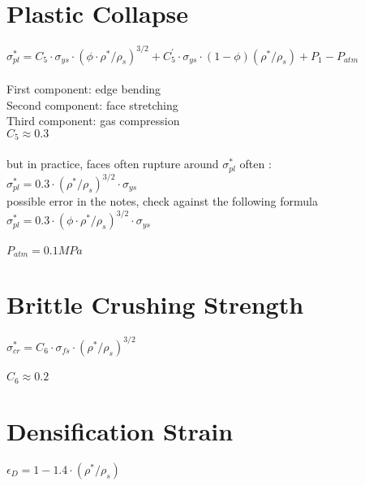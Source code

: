 \documentclass[12pt]{article}
\begin{document}
\section{Plastic Collapse}

\Large
$\sigma^*_{pl} = C_5 \cdot \sigma_{ys} \cdot (\phi \cdot \rho^* / \rho_s)^{3/2} +
C_5^{'} \cdot \sigma_{ys} \cdot (1-\phi) (\rho^* / \rho_s) +
P_1-P_{atm}$\\
\\
\normalsize
First component: edge bending\\
Second component: face stretching\\
Third component: gas compression\\
$C_5 \approx 0.3$\\
\\
but in practice, faces often rupture around $\sigma^*_{pl}$
often :\\
\Large
$\sigma^*_{pl} = 0.3 \cdot (\rho^* / \rho_s)^{3/2} \cdot \sigma_{ys}$\\
\normalsize
possible error in the notes, check against the following formula\\
\Large
$\sigma^*_{pl} = 0.3 \cdot (\phi \cdot \rho^* / \rho_s)^{3/2} \cdot \sigma_{ys}$\\
\\
\normalsize
$P_{atm}=0.1 MPa$\\

\section{Brittle Crushing Strength}

$\sigma^*_{cr} = C_6 \cdot \sigma_{fs} \cdot (\rho^* / \rho_s)^{3/2}$\\
\\
$C_6 \approx 0.2$\\

\section{Densification Strain}
$\epsilon_D = 1 - 1.4 \cdot (\rho^* / \rho_s)$
\end{document}

